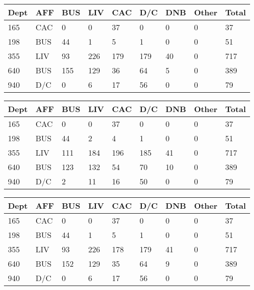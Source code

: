 \documentclass[12pt]{article}
\begin{document}
		\begin{center}
			 \label{tab:title} 
			\begin{tabular} { | l | l | l | l | l | l | l | l | l | }
				\hline
				Dept & AFF & BUS & LIV & CAC & D/C & DNB & Other & Total \\ \hline
				165 & CAC & 0 & 0 & 37 & 0 & 0 & 0 & 37 \\ \hline
				198 & BUS & 44 & 1 & 5 & 1 & 0 & 0 & 51 \\ \hline
				355 & LIV & 93 & 226 & 179 & 179 & 40 & 0 & 717 \\ \hline
				640 & BUS & 155 & 129 & 36 & 64 & 5 & 0 & 389 \\ \hline
				940 & D/C & 0 & 6 & 17 & 56 & 0 & 0 & 79 \\ \hline
			\end{tabular}
		\end{center}

		\begin{center}
			 \label{tab:title} 
			\begin{tabular} { | l | l | l | l | l | l | l | l | l | }
				\hline
				Dept & AFF & BUS & LIV & CAC & D/C & DNB & Other & Total \\ \hline
				165 & CAC & 0 & 0 & 37 & 0 & 0 & 0 & 37 \\ \hline
				198 & BUS & 44 & 2 & 4 & 1 & 0 & 0 & 51 \\ \hline
				355 & LIV & 111 & 184 & 196 & 185 & 41 & 0 & 717 \\ \hline
				640 & BUS & 123 & 132 & 54 & 70 & 10 & 0 & 389 \\ \hline
				940 & D/C & 2 & 11 & 16 & 50 & 0 & 0 & 79 \\ \hline
			\end{tabular}
		\end{center}

		\begin{center}
			 \label{tab:title} 
			\begin{tabular} { | l | l | l | l | l | l | l | l | l | }
				\hline
				Dept & AFF & BUS & LIV & CAC & D/C & DNB & Other & Total \\ \hline
				165 & CAC & 0 & 0 & 37 & 0 & 0 & 0 & 37 \\ \hline
				198 & BUS & 44 & 1 & 5 & 1 & 0 & 0 & 51 \\ \hline
				355 & LIV & 93 & 226 & 178 & 179 & 41 & 0 & 717 \\ \hline
				640 & BUS & 152 & 129 & 35 & 64 & 9 & 0 & 389 \\ \hline
				940 & D/C & 0 & 6 & 17 & 56 & 0 & 0 & 79 \\ \hline
			\end{tabular}
		\end{center}
\end{document}
